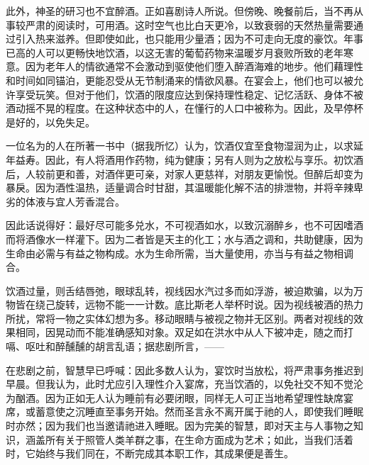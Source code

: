 此外，神圣的研习也不宜醉酒。正如喜剧诗人所说。但傍晚、晚餐前后，当不再从事较严肃的阅读时，可用酒。这时空气也比白天更冷，以致衰弱的天然热量需要通过引入热来滋养。但即使如此，也只能用少量酒；因为不可走向无度的豪饮。年事已高的人可以更畅快地饮酒，以这无害的葡萄药物来温暖岁月衰败所致的老年寒意。因为老年人的情欲通常不会激动到驱使他们堕入醉酒海难的地步。他们藉理性和时间如同锚泊，更能忍受从无节制涌来的情欲风暴。在宴会上，他们也可以被允许享受玩笑。但对于他们，饮酒的限度应达到保持理性稳定、记忆活跃、身体不被酒动摇不晃的程度。在这种状态中的人，在懂行的人口中被称为。因此，及早停杯是好的，以免失足。\par

一位名为的人在所著一书中（据我所忆）认为，饮酒仅宜至食物湿润为止，以求延年益寿。因此，有人将酒用作药物，纯为健康；另有人则为之放松与享乐。初饮酒后，人较前更和善，对酒伴更可亲，对家人更慈祥，对朋友更愉悦。但醉后却变为暴戾。因为酒性温热，适量调合时甘甜，其温暖能化解不洁的排泄物，并将辛辣卑劣的体液与宜人芳香混合。\par

因此话说得好：最好尽可能多兑水，不可视酒如水，以致沉溺醉乡，也不可因嗜酒而将酒像水一样灌下。因为二者皆是天主的化工；水与酒之调和，共助健康，因为生命由必需与有益之物构成。水为生命所需，当大量使用，亦当与有益之物相调合。\par

饮酒过量，则舌结唇弛，眼球乱转，视线因水汽过多而如浮游，被迫欺骗，以为万物皆在绕己旋转，远物不能一一计数。底比斯老人举杯时说。因为视线被酒的热力所扰，常将一物之实体幻想为多。移动眼睛与被视之物并无区别。两者对视线的效果相同，因晃动而不能准确感知对象。双足如在洪水中从人下被冲走，随之而打嗝、呕吐和醉醺醺的胡言乱语；据悲剧所言，——\par

\par

在悲剧之前，智慧早已呼喊：因此多数人认为，宴饮时当放松，将严肃事务推迟到早晨。但我认为，此时尤应引入理性介入宴席，充当饮酒的，以免社交不知不觉沦为酗酒。因为正如无人认为睡前有必要闭眼，同样无人可正当地希望理性缺席宴席，或蓄意使之沉睡直至事务开始。然而圣言永不离开属于祂的人，即使我们睡眠时亦然；因为我们也当邀请祂进入睡眠。因为完美的智慧，即对天主与人事物之知识，涵盖所有关于照管人类羊群之事，在生命方面成为艺术；如此，当我们活着时，它始终与我们同在，不断完成其本职工作，其成果便是善生。\par

